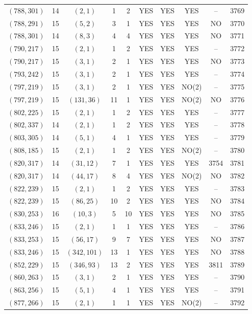 \begin{longtable}{|c|c|c|c|c|c|c|c|c|c|}
$(788, 301)$ & 14 & $(2, 1)$ & 1 & 2 & YES & YES & YES & -- & 3769\\
$(788, 291)$ & 15 & $(5, 2)$ & 3 & 1 & YES & YES & YES & NO & 3770\\
$(788, 301)$ & 14 & $(8, 3)$ & 4 & 4 & YES & YES & YES & NO & 3771\\
$(790, 217)$ & 15 & $(2, 1)$ & 1 & 2 & YES & YES & YES & -- & 3772\\
$(790, 217)$ & 15 & $(3, 1)$ & 2 & 1 & YES & YES & YES & NO & 3773\\
$(793, 242)$ & 15 & $(3, 1)$ & 2 & 1 & YES & YES & YES & -- & 3774\\
$(797, 219)$ & 15 & $(3, 1)$ & 2 & 1 & YES & YES & NO(2) & -- & 3775\\
$(797, 219)$ & 15 & $(131, 36)$ & 11 & 1 & YES & YES & NO(2) & NO & 3776\\
$(802, 225)$ & 15 & $(2, 1)$ & 1 & 2 & YES & YES & YES & -- & 3777\\
$(802, 337)$ & 14 & $(2, 1)$ & 1 & 2 & YES & YES & YES & -- & 3778\\
$(803, 305)$ & 14 & $(5, 1)$ & 4 & 1 & YES & YES & YES & -- & 3779\\
$(808, 185)$ & 15 & $(2, 1)$ & 1 & 2 & YES & YES & NO(2) & -- & 3780\\
$(820, 317)$ & 14 & $(31, 12)$ & 7 & 1 & YES & YES & YES & 3754 & 3781\\
$(820, 317)$ & 14 & $(44, 17)$ & 8 & 4 & YES & YES & NO(2) & NO & 3782\\
$(822, 239)$ & 15 & $(2, 1)$ & 1 & 2 & YES & YES & YES & -- & 3783\\
$(822, 239)$ & 15 & $(86, 25)$ & 10 & 2 & YES & YES & YES & NO & 3784\\
$(830, 253)$ & 16 & $(10, 3)$ & 5 & 10 & YES & YES & YES & NO & 3785\\
$(833, 246)$ & 15 & $(2, 1)$ & 1 & 1 & YES & YES & YES & -- & 3786\\
$(833, 253)$ & 15 & $(56, 17)$ & 9 & 7 & YES & YES & YES & NO & 3787\\
$(833, 246)$ & 15 & $(342, 101)$ & 13 & 1 & YES & YES & YES & NO & 3788\\
$(852, 229)$ & 15 & $(346, 93)$ & 13 & 2 & YES & YES & YES & 3811 & 3789\\
$(860, 263)$ & 15 & $(3, 1)$ & 2 & 1 & YES & YES & YES & -- & 3790\\
$(863, 256)$ & 15 & $(5, 1)$ & 4 & 1 & YES & YES & YES & -- & 3791\\
$(877, 266)$ & 15 & $(2, 1)$ & 1 & 1 & YES & YES & NO(2) & -- & 3792\\

\end{longtable}
